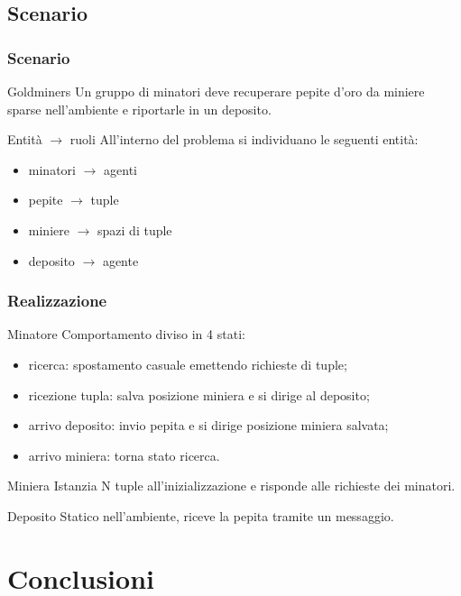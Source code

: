 \documentclass[handout]{beamer}\mode<presentation>{\usetheme{AMSCesenaBleu}}
\begin{document}
\subsection{Scenario}
\begin{frame}
\frametitle{Scenario}
\begin{block}{Goldminers}
Un gruppo di minatori deve recuperare pepite d'oro da miniere sparse nell'ambiente e riportarle in un deposito.
\end{block}
\begin{block}{Entità $\rightarrow$ ruoli}
All'interno del problema si individuano le seguenti entità:
\begin{itemize}
\item \alert{minatori} $\rightarrow$ \alert{agenti}
\item pepite $\rightarrow$ tuple
\item \alert{miniere} $\rightarrow$ \alert{spazi di tuple}
\item deposito $\rightarrow$ agente
\end{itemize}
\end{block}
\end{frame}

\begin{frame}
\frametitle{Realizzazione}
\begin{block}{Minatore}
Comportamento diviso in 4 stati:
\begin{itemize}
\item \alert{ricerca}: spostamento casuale emettendo richieste di tuple;
\item \alert{ricezione tupla}: salva posizione miniera e si dirige al deposito;
\item \alert{arrivo deposito}: invio pepita e si dirige posizione miniera salvata;
\item \alert{arrivo miniera}: torna stato ricerca. 
\end{itemize}
\end{block}
\begin{block}{Miniera}
Istanzia N tuple all'inizializzazione e risponde alle richieste dei minatori.
\end{block}
\begin{block}{Deposito}
Statico nell'ambiente, riceve la pepita tramite un messaggio.
\end{block}
\end{frame}

\section{Conclusioni}
\end{document}

